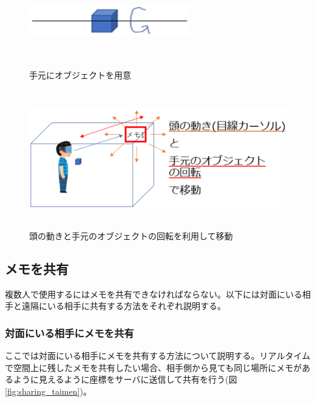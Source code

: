 \documentclass[11pt,a4j, titlepage]{jarticle} %
\begin{document}
\begin{figure}[H]
  \begin{center}
    \includegraphics[clip,height=4.0cm,width=7.0cm]{./3d_fishing3.eps}
    \caption{手元にオブジェクトを用意}
    \label{fig:3d_fishing3}
  \end{center}
\end{figure}

\begin{figure}[H]
  \begin{center}
    \includegraphics[clip,height=6.0cm,width=13.0cm]{./3d_fishing4.eps}
    \caption{頭の動きと手元のオブジェクトの回転を利用して移動}
    \label{fig:3d_fishing4}
  \end{center}
\end{figure}


\subsection{メモを共有}
複数人で使用するにはメモを共有できなければならない。以下には対面にいる相手と遠隔にいる相手に共有する方法をそれぞれ説明する。

\subsubsection{対面にいる相手にメモを共有}
ここでは対面にいる相手にメモを共有する方法について説明する。リアルタイムで空間上に残したメモを共有したい場合、相手側から見ても同じ場所にメモがあるように見えるように座標をサーバに送信して共有を行う(図\ref{fig:sharing_taimen})。
\end{document}
